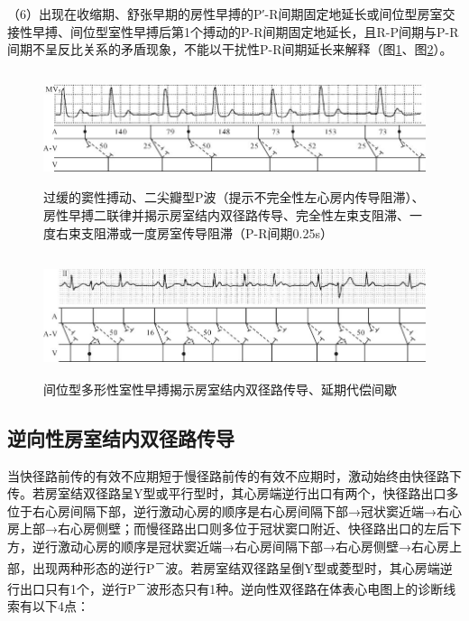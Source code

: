 （6）出现在收缩期、舒张早期的房性早搏的P′-R间期固定地延长或间位型房室交接性早搏、间位型室性早搏后第1个搏动的P-R间期固定地延长，且R-P间期与P-R间期不呈反比关系的矛盾现象，不能以干扰性P-R间期延长来解释（图\ref{fig25-12}、图\ref{fig25-13}）。

\begin{figure}[!htbp]
 \centering
 \includegraphics[width=5.76042in,height=1.3125in]{./images/Image00423.jpg}
 \captionsetup{justification=centering}
 \caption{过缓的窦性搏动、二尖瓣型P波（提示不完全性左心房内传导阻滞）、房性早搏二联律并揭示房室结内双径路传导、完全性左束支阻滞、一度右束支阻滞或一度房室传导阻滞（P-R间期0.25s）}
 \label{fig25-12}
  \end{figure} 

\begin{figure}[!htbp]
 \centering
 \includegraphics[width=5.82292in,height=1.40625in]{./images/Image00424.jpg}
 \captionsetup{justification=centering}
 \caption{间位型多形性室性早搏揭示房室结内双径路传导、延期代偿间歇}
 \label{fig25-13}
  \end{figure} 

\protect\hypertarget{text00032.htmlux5cux23subid383}{}{}

\subsection{逆向性房室结内双径路传导}

当快径路前传的有效不应期短于慢径路前传的有效不应期时，激动始终由快径路下传。若房室结双径路呈Y型或平行型时，其心房端逆行出口有两个，快径路出口多位于右心房间隔下部，逆行激动心房的顺序是右心房间隔下部→冠状窦近端→右心房上部→右心房侧壁；而慢径路出口则多位于冠状窦口附近、快径路出口的左后下方，逆行激动心房的顺序是冠状窦近端→右心房间隔下部→右心房侧壁→右心房上部，出现两种形态的逆行P\textsuperscript{－}波。若房室结双径路呈倒Y型或菱型时，其心房端逆行出口只有1个，逆行P\textsuperscript{－}波形态只有1种。逆向性双径路在体表心电图上的诊断线索有以下4点：

